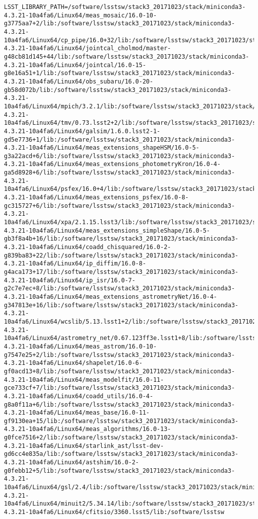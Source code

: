 \begin{verbatim}
LSST_LIBRARY_PATH=/software/lsstsw/stack3_20171023/stack/miniconda3-4.3.21-10a4fa6/Linux64/meas_mosaic/16.0-10-g3775aa7+2/lib:/software/lsstsw/stack3_20171023/stack/miniconda3-4.3.21-10a4fa6/Linux64/cp_pipe/16.0+32/lib:/software/lsstsw/stack3_20171023/stack/miniconda3-4.3.21-10a4fa6/Linux64/jointcal_cholmod/master-g48cb81d145+44/lib:/software/lsstsw/stack3_20171023/stack/miniconda3-4.3.21-10a4fa6/Linux64/jointcal/16.0-15-g8e16a51+1/lib:/software/lsstsw/stack3_20171023/stack/miniconda3-4.3.21-10a4fa6/Linux64/obs_subaru/16.0-20-gb58d072b/lib:/software/lsstsw/stack3_20171023/stack/miniconda3-4.3.21-10a4fa6/Linux64/mpich/3.2.1/lib:/software/lsstsw/stack3_20171023/stack/miniconda3-4.3.21-10a4fa6/Linux64/tmv/0.73.lsst2+2/lib:/software/lsstsw/stack3_20171023/stack/miniconda3-4.3.21-10a4fa6/Linux64/galsim/1.6.0.lsst2-1-gd5e7736+1/lib:/software/lsstsw/stack3_20171023/stack/miniconda3-4.3.21-10a4fa6/Linux64/meas_extensions_shapeHSM/16.0-5-g3a22acd+6/lib:/software/lsstsw/stack3_20171023/stack/miniconda3-4.3.21-10a4fa6/Linux64/meas_extensions_photometryKron/16.0-4-ga5d8928+6/lib:/software/lsstsw/stack3_20171023/stack/miniconda3-4.3.21-10a4fa6/Linux64/psfex/16.0+4/lib:/software/lsstsw/stack3_20171023/stack/miniconda3-4.3.21-10a4fa6/Linux64/meas_extensions_psfex/16.0-8-gc315727+6/lib:/software/lsstsw/stack3_20171023/stack/miniconda3-4.3.21-10a4fa6/Linux64/xpa/2.1.15.lsst3/lib:/software/lsstsw/stack3_20171023/stack/miniconda3-4.3.21-10a4fa6/Linux64/meas_extensions_simpleShape/16.0-5-gb3f8a4b+16/lib:/software/lsstsw/stack3_20171023/stack/miniconda3-4.3.21-10a4fa6/Linux64/coadd_chisquared/16.0-2-g839ba83+22/lib:/software/lsstsw/stack3_20171023/stack/miniconda3-4.3.21-10a4fa6/Linux64/ip_diffim/16.0-8-g4aca173+17/lib:/software/lsstsw/stack3_20171023/stack/miniconda3-4.3.21-10a4fa6/Linux64/ip_isr/16.0-7-g2c7e7ec+8/lib:/software/lsstsw/stack3_20171023/stack/miniconda3-4.3.21-10a4fa6/Linux64/meas_extensions_astrometryNet/16.0-4-g347813e+16/lib:/software/lsstsw/stack3_20171023/stack/miniconda3-4.3.21-10a4fa6/Linux64/wcslib/5.13.lsst1+2/lib:/software/lsstsw/stack3_20171023/stack/miniconda3-4.3.21-10a4fa6/Linux64/astrometry_net/0.67.123ff3e.lsst1+8/lib:/software/lsstsw/stack3_20171023/stack/miniconda3-4.3.21-10a4fa6/Linux64/meas_astrom/16.0-10-g7547e25+2/lib:/software/lsstsw/stack3_20171023/stack/miniconda3-4.3.21-10a4fa6/Linux64/shapelet/16.0-6-gf0acd13+8/lib:/software/lsstsw/stack3_20171023/stack/miniconda3-4.3.21-10a4fa6/Linux64/meas_modelfit/16.0-11-gce733cf+7/lib:/software/lsstsw/stack3_20171023/stack/miniconda3-4.3.21-10a4fa6/Linux64/coadd_utils/16.0-4-g8a0f11a+6/lib:/software/lsstsw/stack3_20171023/stack/miniconda3-4.3.21-10a4fa6/Linux64/meas_base/16.0-11-gf9130ea+15/lib:/software/lsstsw/stack3_20171023/stack/miniconda3-4.3.21-10a4fa6/Linux64/meas_algorithms/16.0-13-g0fce7516+2/lib:/software/lsstsw/stack3_20171023/stack/miniconda3-4.3.21-10a4fa6/Linux64/starlink_ast/lsst-dev-gd6cc4e835a/lib:/software/lsstsw/stack3_20171023/stack/miniconda3-4.3.21-10a4fa6/Linux64/astshim/16.0-2-g0febb12+5/lib:/software/lsstsw/stack3_20171023/stack/miniconda3-4.3.21-10a4fa6/Linux64/gsl/2.4/lib:/software/lsstsw/stack3_20171023/stack/miniconda3-4.3.21-10a4fa6/Linux64/minuit2/5.34.14/lib:/software/lsstsw/stack3_20171023/stack/miniconda3-4.3.21-10a4fa6/Linux64/cfitsio/3360.lsst5/lib:/software/lsstsw
\end{verbatim}
